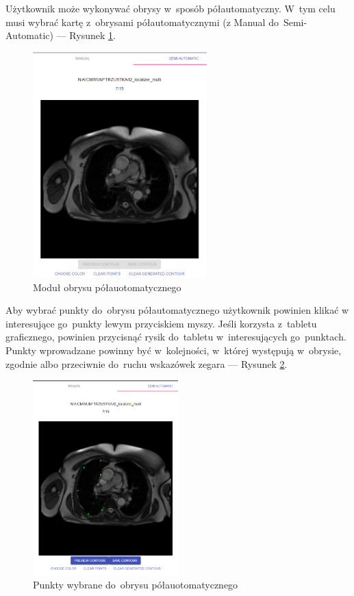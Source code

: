 \documentclass[a4paper,11pt,twoside,openright]{report}
\theoremstyle{definition}
\begin{document}
\begin{enumerate}
\pagebreak

Użytkownik może wykonywać obrysy w~sposób półautomatyczny. W~tym celu musi
wybrać kartę z~obrysami półautomatycznymi (z Manual do~Semi-Automatic) ---
Rysunek \ref{fig:10}.

\begin{figure}[h!]
	\center
	\includegraphics[width=0.6\textwidth]{10}
	\caption{Moduł obrysu półauotomatycznego}
    	\label{fig:10}
\end{figure}

Aby wybrać punkty do~obrysu półautomatycznego użytkownik powinien klikać w
interesujące go~punkty lewym przyciskiem myszy. Jeśli korzysta z~tabletu
graficznego, powinien przycisnąć rysik do~tabletu w~interesujących go~punktach.
Punkty wprowadzane powinny być w~kolejności, w~której występują w~obrysie,
zgodnie albo przeciwnie do~ruchu wskazówek zegara --- Rysunek \ref{fig:11}.

\pagebreak

\begin{figure}[h!]
	\center
	\includegraphics[width=0.5\textwidth]{11}
	\caption{Punkty wybrane do~obrysu półauotomatycznego}
    	\label{fig:11}
\end{figure}


\end{enumerate}
\end{document}
